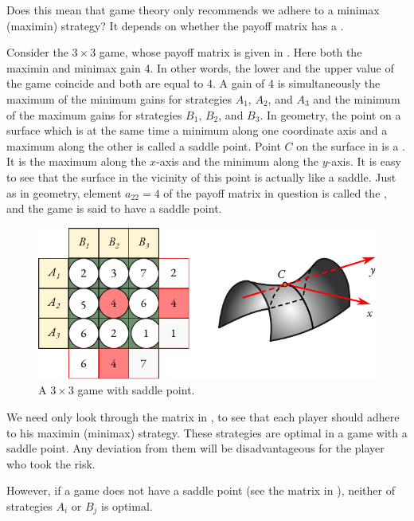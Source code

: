 Does this mean that game theory only recommends we adhere to
a minimax (maximin) strategy? It depends on whether the payoff matrix
has a .

 Consider the $3 \times 3$ game, whose payoff matrix is given in . Here both the maximin and minimax gain 4. In other words, the lower and the upper value of the game coincide and both are equal to 4. A gain of 4 is simultaneously the maximum of
the minimum gains for strategies $A_{1}, \, A_{2}$, and $A_{3}$ and the minimum of the maximum gains for strategies $B_{1}, \, B_{2}$, and $B_{3}$. In geometry, the point on a surface which is at the same time a minimum along one coordinate axis and a maximum along the other is called a saddle point. Point $C$ on the surface in  is a . It is the maximum along the $x$-axis and the minimum along the $y$-axis. It is easy to see that the surface in the vicinity of this point is actually like a saddle. Just as in geometry, element $a_{22} = 4$ of the payoff matrix in question is called the
, and the game is said to have a saddle point.

 \begin{figure}[!h]
 \centering
 \includegraphics[width=\textwidth]{figures/saddle-point.pdf}
\caption{A $3 \times 3$ game with saddle point.\label{saddle-point}}
 \end{figure}
We need only look through the matrix in , to see that each player should adhere to his maximin (minimax) strategy. These strategies
are optimal in a game with a saddle point. Any deviation from them will
be disadvantageous for the player who took the risk.

However, if a game does not have a saddle point (see the matrix in
), neither of strategies $A_{i}$ or $B_{j}$ is optimal.

